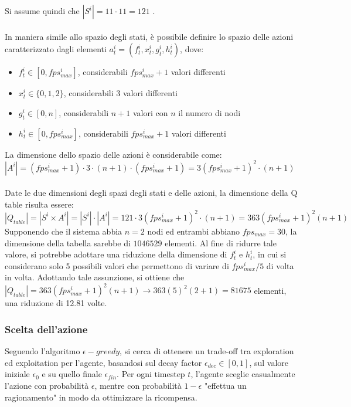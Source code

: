 \documentclass{article}
\begin{document}
{Si assume quindi che $|S^i| = 11 \cdot 11 = 121$ .\\\\
In maniera simile allo spazio degli stati, è possibile definire lo spazio delle azioni caratterizzato dagli elementi $a_t^i = (f_t^i, x_t^i, g_t^i, h_t^i)$, dove:
\begin{itemize}
    \item $f_t^i \in [0, fps_{max}^i]$, considerabili $fps_{max}^i+1$ valori differenti
    \item $x_t^i \in \{0, 1, 2\}$, considerabili 3 valori differenti
    \item $g_t^i \in [0, n]$, considerabili $n+1$ valori con $n$ il numero di nodi
    \item $h_t^i \in [0, fps_{max}^i]$, considerabili $fps_{max}^i+1$ valori differenti
\end{itemize}

La dimensione dello spazio delle azioni è considerabile come:\\ $|A^i| = (fps_{max}^i+1) \cdot 3 \cdot (n+1) \cdot (fps_{max}^i+1) = 3(fps_{max}^i+1)^2\cdot(n+1)$\\\\
Date le due dimensioni degli spazi degli stati e delle azioni, la dimensione della Q table risulta essere: $|Q_{table}| = |S^i \times A^i| = |S^i| \cdot |A^i| = 121 \cdot 3(fps_{max}^i+1)^2\cdot(n+1) = 363(fps_{max}^i+1)^2(n+1)$\\

Supponendo che il sistema abbia $n = 2$ nodi ed entrambi abbiano $fps_{max} = 30$, la dimensione della tabella sarebbe di $1046529$ elementi. Al fine di ridurre tale valore, si potrebbe adottare una riduzione della dimensione di $f_t^i$ e $h_t^i$, in cui si considerano solo 5 possibili valori che permettono di variare di $fps_{max}^i / 5$ di volta in volta. Adottando tale assunzione, si ottiene che $|Q_{table}| = 363(fps_{max}^i+1)^2(n+1) \rightarrow 363(5)^2(2+1) = 81675$  elementi, una riduzione di 12.81 volte. 

\subsubsection{Scelta dell'azione}
Seguendo l'algoritmo $\epsilon-greedy$, si cerca di ottenere un trade-off tra exploration ed exploitation per l'agente, basandosi sul decay factor $\epsilon_{dec} \in[0, 1]$, sul valore iniziale $\epsilon_0$ e su quello finale $\epsilon_{fin}$. Per ogni timestep $t$, l'agente sceglie casualmente l'azione con probabilità $\epsilon$, mentre con probabilità $1 - \epsilon$ "effettua un ragionamento" in modo da ottimizzare la ricompensa.

}
\end{document}
